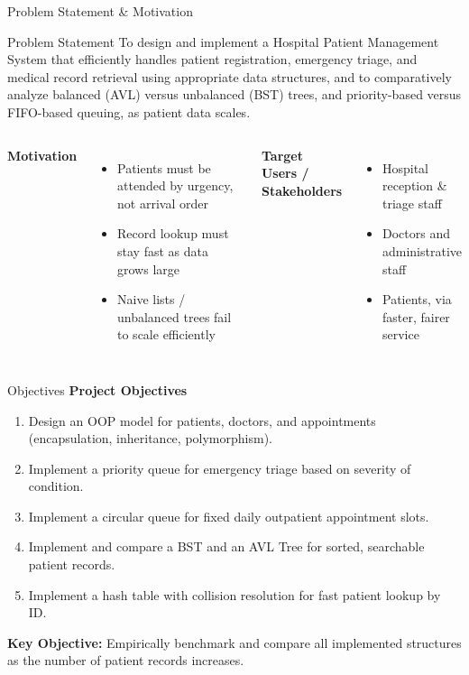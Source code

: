 \documentclass[aspectratio=169,11pt]{beamer}
\begin{document}
\begin{frame}{Problem Statement \& Motivation}
\begin{block}{Problem Statement}
To design and implement a Hospital Patient Management System that efficiently handles patient registration, emergency triage, and medical record retrieval using appropriate data structures, and to comparatively analyze balanced (AVL) versus unbalanced (BST) trees, and priority-based versus FIFO-based queuing, as patient data scales.
\end{block}
\vspace{2mm}
\begin{columns}[T,totalwidth=\textwidth]
\textbf{\color{GEUBlue}Motivation}
\begin{itemize}\itemsep2pt
\item Patients must be attended by urgency, not arrival order
\item Record lookup must stay fast as data grows large
\item Naive lists / unbalanced trees fail to scale efficiently
\end{itemize}
\textbf{\color{GEUBlue}Target Users / Stakeholders}
\begin{itemize}\itemsep2pt
\item Hospital reception \& triage staff
\item Doctors and administrative staff
\item Patients, via faster, fairer service
\end{itemize}
\end{columns}
\end{frame}

\begin{frame}{Objectives}
\textbf{\color{GEUBlue}Project Objectives}
\vspace{2mm}
\begin{enumerate}\itemsep5pt
\item Design an OOP model for patients, doctors, and appointments (encapsulation, inheritance, polymorphism).
\item Implement a priority queue for emergency triage based on severity of condition.
\item Implement a circular queue for fixed daily outpatient appointment slots.
\item Implement and compare a BST and an AVL Tree for sorted, searchable patient records.
\item Implement a hash table with collision resolution for fast patient lookup by ID.
\end{enumerate}
\vfill
\begin{center}
\colorbox{GEULightBlue}{\parbox{.80\textwidth}{\centering
\textbf{Key Objective:} Empirically benchmark and compare all implemented structures as the number of patient records increases.}}
\end{center}
\end{frame}
\end{document}
